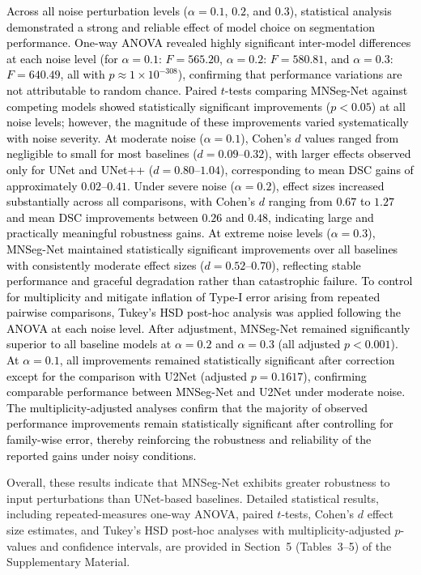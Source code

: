 \textcolor{black}{Across all noise perturbation levels ($\alpha = 0.1$, $0.2$, and $0.3$), statistical analysis demonstrated a strong and reliable effect of model choice on segmentation performance. One-way ANOVA revealed highly significant inter-model differences at each noise level (for $\alpha = 0.1$: $F = 565.20$, $\alpha = 0.2$: $F = 580.81$, and $\alpha = 0.3$: $F = 640.49$, all with $p \approx 1 \times 10^{-308}$), confirming that performance variations are not attributable to random chance. Paired $t$-tests comparing MNSeg-Net against competing models showed statistically significant improvements ($p < 0.05$) at all noise levels; however, the magnitude of these improvements varied systematically with noise severity. At moderate noise ($\alpha = 0.1$), Cohen’s $d$ values ranged from negligible to small for most baselines ($d = 0.09$–$0.32$), with larger effects observed only for UNet and UNet++ ($d = 0.80$–$1.04$), corresponding to mean DSC gains of approximately $0.02$–$0.41$. Under severe noise ($\alpha = 0.2$), effect sizes increased substantially across all comparisons, with Cohen’s $d$ ranging from $0.67$ to $1.27$ and mean DSC improvements between $0.26$ and $0.48$, indicating large and practically meaningful robustness gains. At extreme noise levels ($\alpha = 0.3$), MNSeg-Net maintained statistically significant improvements over all baselines with consistently moderate effect sizes ($d = 0.52$–$0.70$), reflecting stable performance and graceful degradation rather than catastrophic failure.  To control for multiplicity and mitigate inflation of Type-I error arising from repeated pairwise comparisons, Tukey’s HSD post-hoc analysis was applied following the ANOVA at each noise level. After adjustment, MNSeg-Net remained significantly superior to all baseline models at $\alpha = 0.2$ and $\alpha = 0.3$ (all adjusted $p < 0.001$). At $\alpha = 0.1$, all improvements remained statistically significant after correction except for the comparison with U2Net (adjusted $p = 0.1617$), confirming comparable performance between MNSeg-Net and U2Net under moderate noise. The multiplicity-adjusted analyses confirm that the majority of observed performance improvements remain statistically significant after controlling for family-wise error, thereby reinforcing the robustness and reliability of the reported gains under noisy conditions.}

Overall, these results indicate that MNSeg-Net exhibits greater robustness to input perturbations than UNet-based baselines. Detailed statistical results, including repeated-measures one-way ANOVA, paired $t$-tests, Cohen’s $d$ effect size estimates, and Tukey’s HSD post-hoc analyses with multiplicity-adjusted $p$-values and confidence intervals, are provided in Section~5 (Tables~3–5) of the Supplementary Material. 



